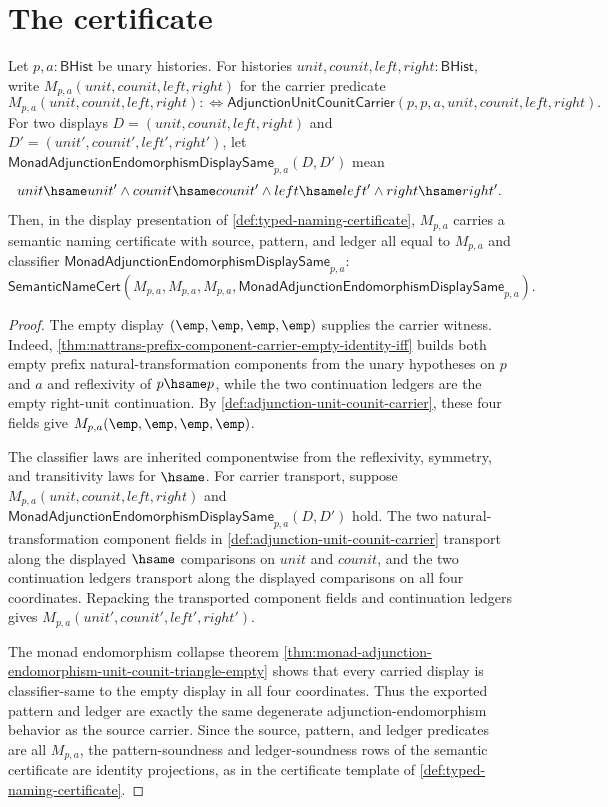 \section{The certificate}
\label{sec:monad-certificate}

\begin{theorem}
\label{thm:monad-adjunction-endomorphism-semantic-namecert}
Let $p,a:\mathsf{BHist}$ be unary histories. For histories
$unit,counit,left,right:\mathsf{BHist}$, write
$M_{p,a}(unit,counit,left,right)$ for the carrier predicate
$$
M_{p,a}(unit,counit,left,right)
:\Longleftrightarrow
\mathsf{AdjunctionUnitCounitCarrier}(p,p,a,unit,counit,left,right).
$$
For two displays $D=(unit,counit,left,right)$ and
$D'=(unit',counit',left',right')$, let
$\mathsf{MonadAdjunctionEndomorphismDisplaySame}_{p,a}(D,D')$ mean
$$
unit\hsame unit'\land counit\hsame counit'\land
left\hsame left'\land right\hsame right'.
$$
Then, in the display presentation of \autoref{def:typed-naming-certificate},
$M_{p,a}$ carries a semantic naming certificate with source, pattern, and
ledger all equal to $M_{p,a}$ and classifier
$\mathsf{MonadAdjunctionEndomorphismDisplaySame}_{p,a}$:
$$
\mathsf{SemanticNameCert}
(M_{p,a},M_{p,a},M_{p,a},
\mathsf{MonadAdjunctionEndomorphismDisplaySame}_{p,a}).
$$
\end{theorem}
\begin{proof}
The empty display $(\emp,\emp,\emp,\emp)$ supplies the carrier witness. Indeed,
\autoref{thm:nattrans-prefix-component-carrier-empty-identity-iff} builds both
empty prefix natural-transformation components from the unary hypotheses on
$p$ and $a$ and reflexivity of $p\hsame p$, while the two continuation ledgers
are the empty right-unit continuation. By
\autoref{def:adjunction-unit-counit-carrier}, these four fields give
$M_{p,a}(\emp,\emp,\emp,\emp)$.

The classifier laws are inherited componentwise from the reflexivity, symmetry,
and transitivity laws for $\hsame$. For carrier transport, suppose
$M_{p,a}(unit,counit,left,right)$ and
$\mathsf{MonadAdjunctionEndomorphismDisplaySame}_{p,a}(D,D')$ hold. The two
natural-transformation component fields in
\autoref{def:adjunction-unit-counit-carrier} transport along the displayed
$\hsame$ comparisons on $unit$ and $counit$, and the two continuation ledgers
transport along the displayed comparisons on all four coordinates. Repacking
the transported component fields and continuation ledgers gives
$M_{p,a}(unit',counit',left',right')$.

The monad endomorphism collapse theorem
\autoref{thm:monad-adjunction-endomorphism-unit-counit-triangle-empty} shows
that every carried display is classifier-same to the empty display in all four
coordinates. Thus the exported pattern and ledger are exactly the same
degenerate adjunction-endomorphism behavior as the source carrier. Since the
source, pattern, and ledger predicates are all $M_{p,a}$, the pattern-soundness
and ledger-soundness rows of the semantic certificate are identity projections,
as in the certificate template of \autoref{def:typed-naming-certificate}.
\end{proof}

